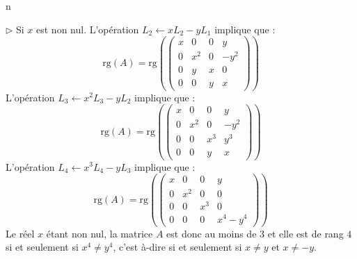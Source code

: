n\documentclass[a4paper,10pt]{report}
\begin{document}
\noindent $\rhd$ Si $x$ est non nul. L'opération $L_2 \leftarrow x L_2 - y L_1$ implique que :
$$ \textrm{rg}(A) = \textrm{rg} \left(\begin{pmatrix}
x & 0 & 0& y \\
0 & x^2 & 0 & -y^2 \\
0 & y & x & 0 \\
0 & 0 & y & x
\end{pmatrix} \right)$$
L'opération $L_3 \leftarrow x^2 L_3-y L_2$ implique que :
$$ \textrm{rg}(A) = \textrm{rg} \left(\begin{pmatrix}
x & 0 & 0& y \\
0 & x^2 & 0 & -y^2 \\
0 & 0 & x^3 & y^3 \\
0 & 0 & y & x
\end{pmatrix} \right)$$
L'opération $L_4 \leftarrow x^3 L_4-y L_3$ implique que :
$$ \textrm{rg}(A) = \textrm{rg} \left(\begin{pmatrix}
x & 0 & 0& y \\
0 & x^2 & 0 & 0 \\
0 & 0 & x^3 & 0 \\
0 & 0 & 0 & x^4-y^4
\end{pmatrix} \right)$$
Le réel $x$ étant non nul, la matrice $A$ est donc au moins de $3$ et elle est de rang $4$ si et seulement si $x^4 \neq y^4$, c'est à-dire si et seulement si $x \neq y$ et $x \neq -y$.
%
%
%
%
\end{document}
